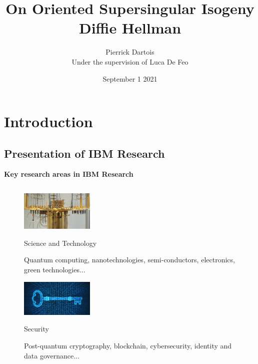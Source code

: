 \documentclass[10pt]{beamer}
\institute{IBM Research Zurich\\ Université de Rennes 1}
\title{On Oriented Supersingular Isogeny Diffie Hellman}
\author{Pierrick Dartois \\ Under the supervision of Luca De Feo}
\date{September 1 2021}
\theoremstyle{plain}
\theoremstyle{definition}
\renewcommand{\(}{\left(}
\renewcommand{\)}{\right)}
\begin{document}
\begin{frame}
\titlepage
\end{frame}

\begin{frame}
\tableofcontents
\end{frame}

\section{Introduction}

\subsection{Presentation of IBM Research}

\begin{frame}
\textbf{Key research areas in IBM Research}

\begin{columns}[t]
\begin{figure}
\includegraphics[width=3.5cm]
{science_and_technology.png} 

Science and Technology

\vspace{0.1cm}

{ {\footnotesize Quantum computing, nanotechnologies, semi-conductors, electronics,  green technologies...}\\}
\vspace{0.3cm}


\includegraphics[width=3.5cm]
{security.jpg} 

Security

\vspace{0.1cm}

{ {\footnotesize Post-quantum cryptography, blockchain, cybersecurity, identity and data governance...}\\}
\end{figure}




\end{columns}
\end{frame}
\end{document}
